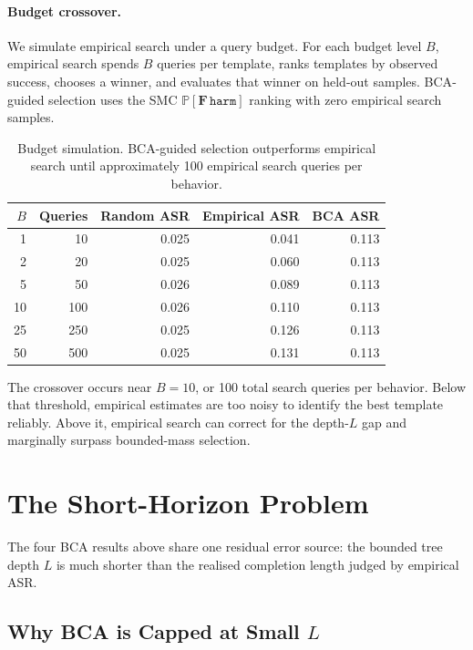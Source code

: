 \documentclass[11pt]{article}
\newcommand{\Prob}{\mathbb{P}}
\newcommand{\harm}{\texttt{harm}}
\newcommand{\BCA}{\textsc{BCA}}
\newcommand{\ASR}{\textsc{ASR}}
\begin{document}
\paragraph{Budget crossover.}
We simulate empirical search under a query budget.  For each budget level $B$, empirical search spends $B$ queries per template, ranks templates by observed success, chooses a winner, and evaluates that winner on held-out samples.  \BCA-guided selection uses the SMC $\Prob[\mathbf{F}\,\harm]$ ranking with zero empirical search samples.

\begin{table}[t]
\centering
\small
\begin{tabular}{rrrrr}
\toprule
$B$ & \textbf{Queries} & \textbf{Random ASR} & \textbf{Empirical ASR} & \textbf{BCA ASR}\\
\midrule
1 & 10 & 0.025 & 0.041 & 0.113\\
2 & 20 & 0.025 & 0.060 & 0.113\\
5 & 50 & 0.026 & 0.089 & 0.113\\
10 & 100 & 0.026 & 0.110 & 0.113\\
25 & 250 & 0.025 & 0.126 & 0.113\\
50 & 500 & 0.025 & 0.131 & 0.113\\
\bottomrule
\end{tabular}
\caption{Budget simulation.  \BCA-guided selection outperforms empirical search until approximately 100 empirical search queries per behavior.}
\label{tab:budget}
\end{table}

The crossover occurs near $B=10$, or 100 total search queries per behavior.  Below that threshold, empirical estimates are too noisy to identify the best template reliably.  Above it, empirical search can correct for the depth-$L$ gap and marginally surpass bounded-mass selection.

\section{The Short-Horizon Problem}
\label{sec:short-horizon}

The four \BCA{} results above share one residual error source: the bounded tree depth $L$ is much shorter than the realised completion length judged by empirical \ASR.

\subsection{Why \BCA{} is Capped at Small $L$}
\end{document}
